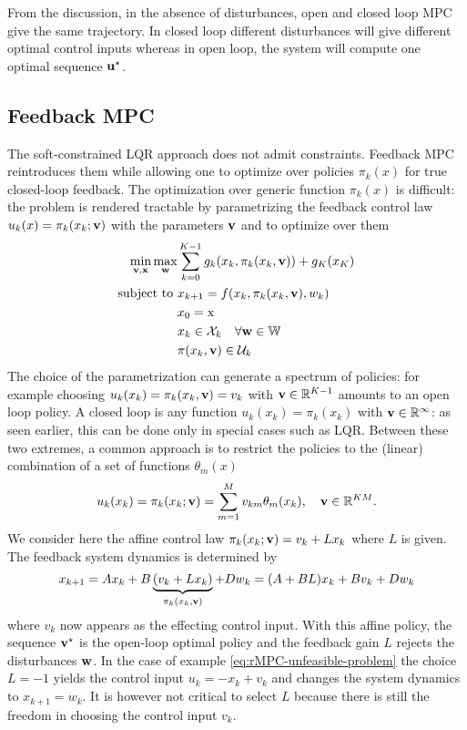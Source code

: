 From the discussion, in the absence of disturbances, open and closed loop MPC give the same trajectory. In closed loop different disturbances will give different optimal control inputs whereas in open loop, the system will compute one optimal sequence $\boldsymbol{\mathrm{u}}^\star$.

\subsection{Feedback MPC}
\label{sec:feedback-MPC}

The soft-constrained LQR approach does not admit constraints. Feedback MPC reintroduces them while allowing one to optimize over policies $\pi_k(x)$ for true closed-loop feedback. The optimization over generic function $\pi_k(x)$ is difficult: the problem is rendered tractable by parametrizing the feedback control law $u_k(x) = \pi_k(x_k;\boldsymbol{\mathrm{v}})$ with the parameters $\boldsymbol{\mathrm{v}}$ and to optimize over them
\begin{equation}
  \label{eq:feedback-MPC}
  \begin{aligned}
    \min_{\bsv,\bsx} \max_{\bsw} & \sum_{k=0}^{K-1} g_k(x_k,\pi_k(x_k,\bsv)) + g_K(x_K) \\
    \text{subject to } & x_{k+1} = f(x_k,\pi_k(x_k,\bsv),w_k) \\
                                 & x_0 = \mathrm{x} \\
                                 & x_k \in \mathcal{X}_k\quad \forall \bsw \in \mathbb{W} \\
                                 & \pi(x_k,\bsv) \in \mathcal{U}_k %
  \end{aligned}
\end{equation}
The choice of the parametrization can generate a spectrum of policies: for example choosing $u_k(x_k) = \pi_k(x_k,\boldsymbol{\mathrm{v}}) = v_k$ with $\boldsymbol{\mathrm{v}}\in \mathbb{R}^{K-1}$ amounts to an open loop policy. A closed loop is any function $u_k(x_k)=\pi_k(x_k)$ with $\boldsymbol{\mathrm{v}}\in \mathbb{R}^\infty$: as seen earlier, this can be done only in special cases such as LQR. Between these two extremes, a common approach is to restrict the policies to the (linear) combination of a set of functions $\theta_m(x)$
\begin{equation*}
  u_k(x_k) = \pi_k(x_k;\boldsymbol{\mathrm{v}}) = \sum_{m=1}^M v_{km}\theta_m(x_k),\quad \boldsymbol{\mathrm{v}}\in \mathbb{R}^{KM}.
\end{equation*}
We consider here the affine control law $\pi_k(x_k;\boldsymbol{\mathrm{v}}) = v_k + Lx_k$ where $L$ is given. The feedback system dynamics is determined by
\begin{equation*}
  x_{k+1} = Ax_k + B\underbrace{(v_k+Lx_k)}_{\pi_k(x_k,\boldsymbol{\mathrm{v}})} + Dw_k = (A+BL)x_k + Bv_k + Dw_k
\end{equation*}
where $v_k$ now appears as the effecting control input. With this affine policy, the sequence $\boldsymbol{\mathrm{v}}^\star$ is the open-loop optimal policy and the feedback gain $L$ rejects the disturbances $\boldsymbol{\mathrm{w}}$. In the case of example \ref{eq:rMPC-unfeasible-problem} the choice $L=-1$ yields the control input $u_k=-x_k+v_k$ and changes the system dynamics to $x_{k+1}=w_k$. It is however not critical to select $L$ because there is still the freedom in choosing the control input $v_k$.

